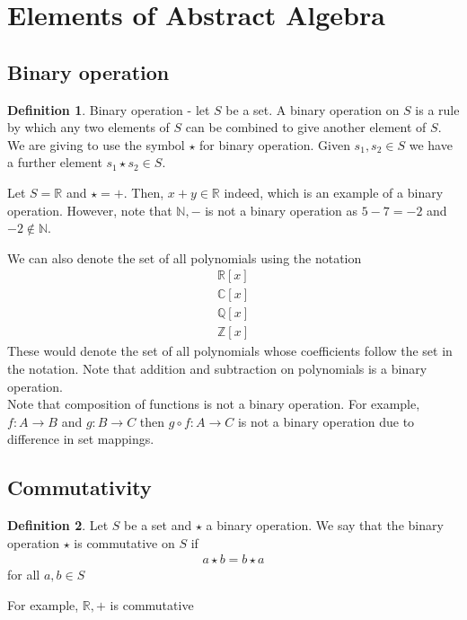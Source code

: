 \documentclass[a4paper]{article}
\theoremstyle{plain}
\theoremstyle{definition}
\newtheorem{defn}{Definition}[section]
\newtheorem{exmp}{Example}[section]
\theoremstyle{remark}
\begin{document}
\section{Elements of Abstract Algebra}
\subsection{Binary operation}

\begin{defn}
	Binary operation - let $S$ be a set. A binary operation on $S$ is a rule by which any two elements of $S$ can be combined to give another element of $S$. We are giving to use the symbol $\star$ for binary operation. Given $s_1,s_2 \in S$ we have a further element $s_1 \star s_2 \in S$.
	\begin{tcolorbox}[colback=black!3!white,colframe=black!60!white,title=\begin{exmp}Example binary operations \label{Example binary operations}\end{exmp}]
	        Let $S = \mathbb{R}$ and $\star = +$. Then, $x+y \in \mathbb{R}$ indeed, which is an example of a binary operation. However, note that $\mathbb{N}, -$ is not a binary operation as $5-7 = -2 $ and $-2 \not\in \mathbb{N}$.
	\end{tcolorbox}
\end{defn}
	We can also denote the set of all polynomials using the notation
	\begin{align*}
		\mathbb{R}[x]\\
		\mathbb{C}[x]\\
		\mathbb{Q}[x]\\
		\mathbb{Z}[x]
	\end{align*}
	These would denote the set of all polynomials whose coefficients follow the set in the notation. Note that addition and subtraction on polynomials is a binary operation. \\
	Note that composition of functions is not a binary operation. For example, $f : A\to B$ and $g: B\to C$ then $g \circ f : A \to C$ is not a binary operation due to difference in set mappings. 
\subsection{Commutativity}
\begin{defn}
	Let $S$ be a set and $\star$ a binary operation. We say that the binary operation $\star$ is commutative on $S$ if
	\begin{align*}
	a \star b = b \star a	
	\end{align*}
	for all $a,b \in S$
\end{defn}
\begin{tcolorbox}[colback=black!3!white,colframe=black!60!white,title=\begin{exmp}Examples of commutativity \label{Examples of commutativity}\end{exmp}]
        For example, $\mathbb{R},+$ is commutative
\end{tcolorbox}
\end{document}
